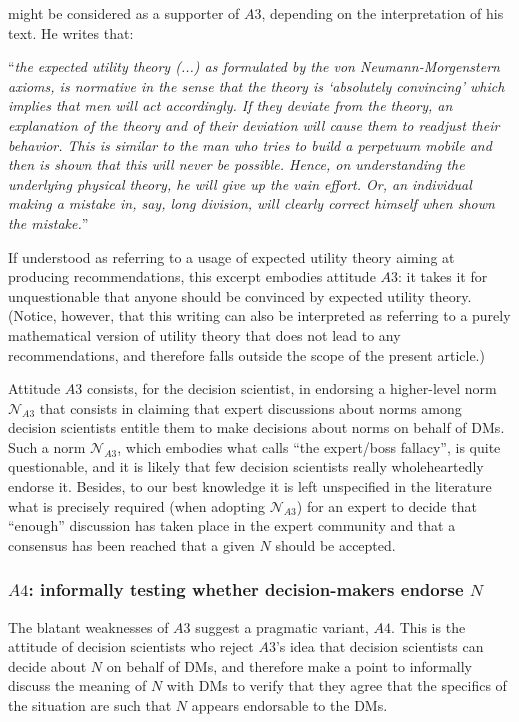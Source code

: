 \documentclass[preprint, french, english, 11pt, authoryear]{elsarticle}%
\newcommand{\protectforpdf}[1]{\texorpdfstring{\ensuremath{#1}}{#1}}
\begin{document}
\citet[p. 180]{morgenstern_reflections_1979} might be considered as a supporter of $A3$, depending on the interpretation of his text. He writes that: 

\begin{addmargin}[3em]{3em}
“\emph{the expected utility theory (...) as formulated by the von Neumann-Morgenstern axioms, is normative in the sense that the theory is ‘absolutely convincing’ which implies that men will act accordingly. If they deviate from the theory, an explanation of the theory and of their deviation will cause them to readjust their behavior. This is similar to the man who tries to build a perpetuum mobile and then is shown that this will never be possible. Hence, on understanding the underlying physical theory, he will give up the vain effort. Or, an individual making a mistake in, say, long division, will clearly correct himself when shown the mistake.}” 
\end{addmargin}
If understood as referring to a usage of expected utility theory aiming at producing recommendations, this excerpt embodies attitude $A3$: it takes it for unquestionable that anyone should be convinced by expected utility theory. (Notice, however, that this writing can also be interpreted as referring to a purely mathematical version of utility theory that does not lead to any recommendations, and therefore falls outside the scope of the present article.)

Attitude $A3$ consists, for the decision scientist, in endorsing a higher-level norm $\mathscr{N}_{A3}$ that consists in claiming that expert discussions about norms among decision scientists entitle them to make decisions about norms on behalf of \acp{DM}. Such a norm $\mathscr{N}_{A3}$, which embodies what \citet{estlund_democratic_2009} calls “the expert/boss fallacy”, is quite questionable, and it is likely that few decision scientists really wholeheartedly endorse it. Besides, to our best knowledge it is left unspecified in the literature what is precisely required (when adopting  $\mathscr{N}_{A3}$) for an expert to decide that “enough” discussion has taken place in the expert community and that a consensus has been reached that a given $N$ should be accepted. 

\subsubsection{\protectforpdf{A4}: informally testing whether decision-makers endorse \protectforpdf{N}}
The blatant weaknesses of $A3$ suggest a pragmatic variant, $A4$. This is the attitude of decision scientists who reject $A3$'s idea that decision scientists can decide about $N$ on behalf of \acp{DM}, and therefore make a point to informally discuss the meaning of $N$ with \acp{DM} to verify that they agree that the specifics of the situation are such that $N$ appears endorsable to the \acp{DM}.
\end{document}
